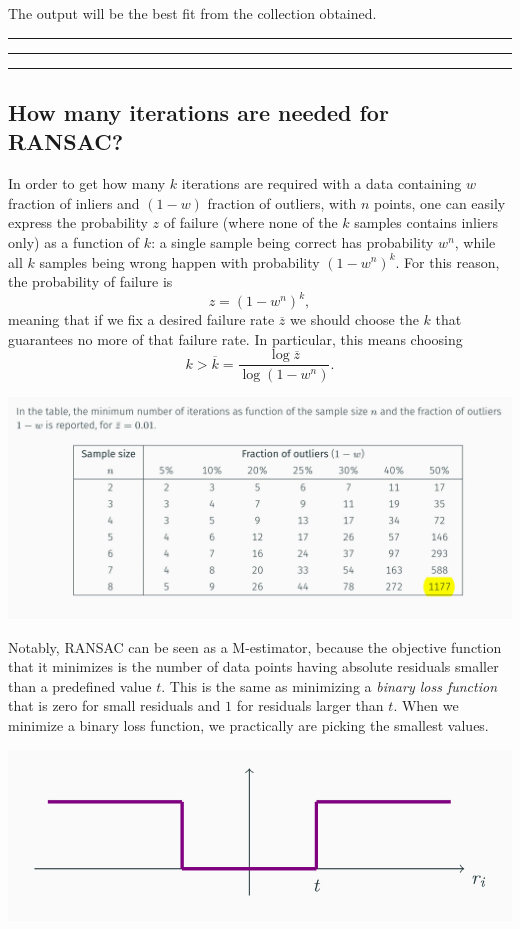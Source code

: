 \documentclass[10pt]{report}
\begin{document}
The output will be the best fit from the collection obtained.

\vspace*{0.6cm}\hrule
\hrule
\hrule
\vspace*{0.4cm}

\subsection{How many iterations are needed for RANSAC?}
\label{how-many-iterations-are-needed-for-ransac}
In order to get how many \(k\) iterations are required with a data
containing \(w\) fraction of inliers and \((1 - w)\) fraction of
outliers, with \(n\) points, one can easily express the probability
\(z\) of failure (where none of the \(k\) samples contains inliers only)
as a function of \(k\): a single sample being correct has probability
\(w^n\), while all \(k\) samples being wrong happen with probability
\((1 - w^n)^k\). For this reason, the probability of failure is
\[z = (1 - w^n)^k,\] meaning that if we fix a desired failure rate
\(\overline{z}\) we should choose the \(k\) that guarantees no more of
that failure rate. In particular, this means choosing
\[k > \overline{k} = \frac{\log{\overline{z}}}{\log{(1 - w^n)}}.\]

\begin{center}
\includegraphics[width=.9\linewidth]{./pics/fit/ransac-min-iterations.jpg}
\end{center}

Notably, RANSAC can be seen as a M-estimator, because the objective
function that it minimizes is the number of data points having absolute
residuals smaller than a predefined value \(t\). This is the same as
minimizing a \emph{binary loss function} that is zero for small residuals and
\(1\) for residuals larger than \(t\). When we minimize a binary loss
function, we practically are picking the smallest values.

\begin{center}
\includegraphics[width=.9\linewidth]{./pics/fit/ransac-as-m-estimator.jpg}
\end{center}
\end{document}
